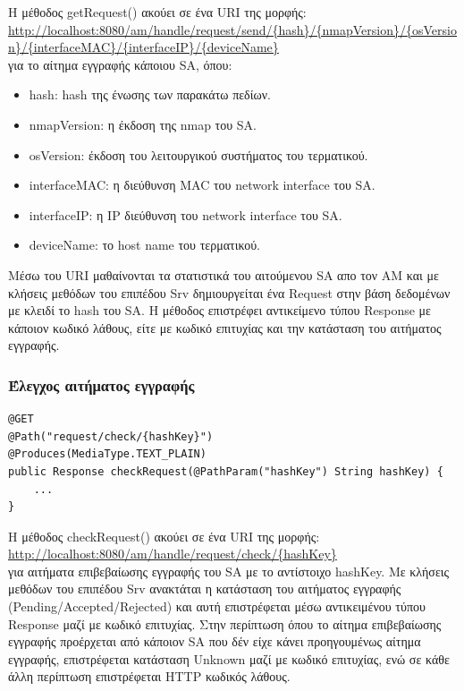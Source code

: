 \documentclass[a4paper,11pt]{article}
\begin{document}
\begin{sloppypar}
\begin{lstlisting}
\end{lstlisting}
H μέθοδος getRequest() ακούει σε ένα URI της μορφής:
\\
\url{http://localhost:8080/am/handle/request/send/{hash}/{nmapVersion}/{osVersion}/{interfaceMAC}/{interfaceIP}/{deviceName}}
\\
για το αίτημα εγγραφής κάποιου SA, όπου:

\begin{itemize}

\item hash: hash της ένωσης των παρακάτω πεδίων.
\item nmapVersion: η έκδοση της nmap του SA.
\item osVersion: έκδοση του λειτουργικού συστήματος του τερματικού.
\item interfaceMAC: η διεύθυνση MAC του network interface του SA.
\item interfaceIP: η IP διεύθυνση του network interface του SA.
\item deviceName: το host name του τερματικού.

\end{itemize}

Μέσω του URI μαθαίνονται τα στατιστικά του αιτούμενου SA απο τον AM και με κλήσεις μεθόδων του επιπέδου Srv δημιουργείται ένα Request στην βάση δεδομένων με κλειδί το hash του SA. Η μέθοδος επιστρέφει αντικείμενο τύπου Response με κάποιον κωδικό λάθους, είτε με κωδικό επιτυχίας και την κατάσταση του αιτήματος εγγραφής.

\subsubsection{Έλεγχος αιτήματος εγγραφής}

\begin{lstlisting}
@GET
@Path("request/check/{hashKey}")
@Produces(MediaType.TEXT_PLAIN)
public Response checkRequest(@PathParam("hashKey") String hashKey) {
    ...
}
\end{lstlisting}

H μέθοδος checkRequest() ακούει σε ένα URI της μορφής:
\\
\url{http://localhost:8080/am/handle/request/check/{hashKey}}
\\
για αιτήματα επιβεβαίωσης εγγραφής του SA με το αντίστοιχο hashKey. Με κλήσεις μεθόδων του επιπέδου Srv ανακτάται η κατάσταση του αιτήματος εγγραφής (Pending/Accepted/Rejected) και αυτή επιστρέφεται μέσω αντικειμένου τύπου Response μαζί με κωδικό επιτυχίας. Στην περίπτωση όπου το αίτημα επιβεβαίωσης εγγραφής προέρχεται από κάποιον SA που δέν είχε κάνει προηγουμένως αίτημα εγγραφής, επιστρέφεται κατάσταση Unknown μαζί με κωδικό επιτυχίας, ενώ σε κάθε άλλη περίπτωση επιστρέφεται HTTP κωδικός λάθους.


\end{sloppypar}
\end{document}
